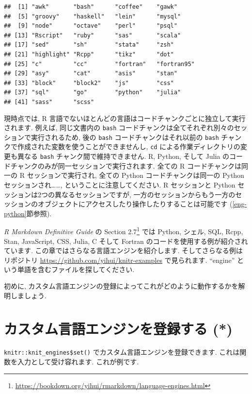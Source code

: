 \documentclass[
  11pt,
]{bxjsreport}
\renewcommand{\href}[2]{#2\footnote{\url{#1}}}
\begin{document}
\begin{verbatim}
##  [1] "awk"       "bash"      "coffee"    "gawk"     
##  [5] "groovy"    "haskell"   "lein"      "mysql"    
##  [9] "node"      "octave"    "perl"      "psql"     
## [13] "Rscript"   "ruby"      "sas"       "scala"    
## [17] "sed"       "sh"        "stata"     "zsh"      
## [21] "highlight" "Rcpp"      "tikz"      "dot"      
## [25] "c"         "cc"        "fortran"   "fortran95"
## [29] "asy"       "cat"       "asis"      "stan"     
## [33] "block"     "block2"    "js"        "css"      
## [37] "sql"       "go"        "python"    "julia"    
## [41] "sass"      "scss"
\end{verbatim}

現時点では, R 言語でないほとんどの言語はコードチャンクごとに独立して実行されます. 例えば, 同じ文書内の \texttt{bash} コードチャンクは全てそれぞれ別々のセッションで実行されるため, 後の \texttt{bash} コードチャンクはそれ以前の \texttt{bash} チャンクで作成された変数を使うことができませんし, \texttt{cd} による作業ディレクトリの変更も異なる \texttt{bash} チャンク間で維持できません. R, Python, そして Julia のコードチャンクのみが同一セッションで実行されます. 全ての R コードチャンクは同一の R セッションで実行され, 全ての Python コードチャンクは同一の Python セッションされ\ldots\ldots, ということに注意してください. R セッションと Python セッションは2つの異なるセッションですが, 一方のセッションからもう一方のセッションのオブジェクトにアクセスしたり操作したりすることは可能です (\ref{eng-python}節参照).

\emph{R Markdown Definitive Guide} \autocite{rmarkdown2018} の \href{https://bookdown.org/yihui/rmarkdown/language-engines.html}{Section 2.7} では Python, シェル, SQL, Rcpp, Stan, JavaScript, CSS, Julia, C そして Fortran のコードを使用する例が紹介されています. この章ではさらなる言語エンジンを紹介します. そしてさらなる例はリポジトリ \url{https://github.com/yihui/knitr-examples} で見られます. ``engine'' という単語を含むファイルを探してください.

初めに, カスタム言語エンジンの登録によってこれがどのように動作するかを解明しましょう.

\hypertarget{custom-engine}{%
\section{カスタム言語エンジンを登録する (*)}\label{custom-engine}}

\texttt{knitr::knit\_engines\$set()} でカスタム言語エンジンを登録できます. これは関数を入力として受け容れます. これが例です.
\end{document}
